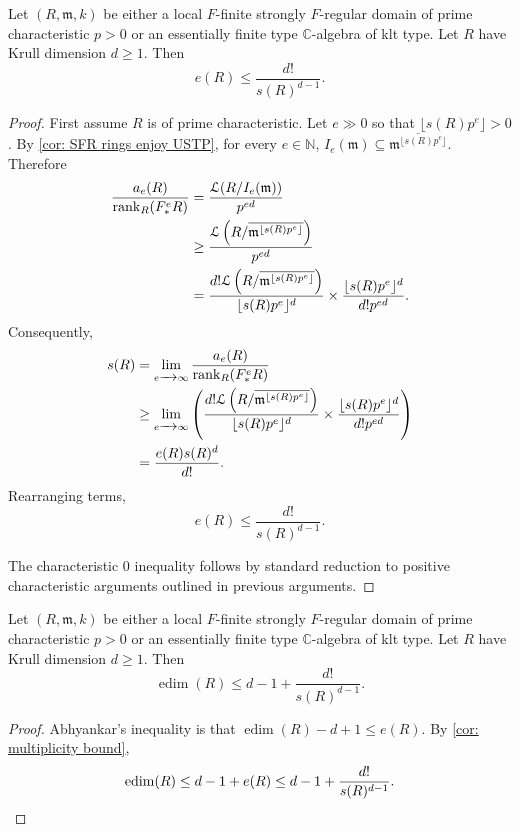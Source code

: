 \documentclass[12pt]{amsart}
\numberwithin{equation}{theorem}
\theoremstyle{plain}
\newcommand{\fm}{\mathfrak{m}}
\newcommand{\CC}{\mathbb{C}}
\newcommand{\NN}{\mathbb{N}}
\DeclareMathOperator{\edim}{edim}
\begin{document}
\begin{theorem}
    \label{cor: multiplicity bound}
    Let $(R,\fm,k)$ be either a local $F$-finite strongly $F$-regular domain of prime characteristic $p>0$ or an essentially finite type $\CC$-algebra of klt type. Let $R$ have Krull dimension $d\geq 1$. Then
    \[
    e(R)\leq \frac{d!}{s(R)^{d-1}}.
    \]
\end{theorem}

\begin{proof}
    First assume $R$ is of prime characteristic. Let $e\gg 0$ so that $\lfloor s(R)p^e\rfloor>0$. By \cref{cor: SFR rings enjoy USTP}, for every $e\in\NN$, $I_e(\fm)\subseteq \overline{\fm^{\lfloor s(R)p^e\rfloor}}.$
    Therefore
    \begin{align*}
    \frac{a_e(R)}{\rank_R(F^e_*R)} &= \frac{\mathcal{L}(R/I_e(\fm))}{p^{ed}}\\
    &\geq \frac{\mathcal{L}\left(R/\overline{\fm^{\lfloor s(R)p^e\rfloor}}\right)}{p^{ed}}\\
    &=\frac{d!\mathcal{L}\left(R/\overline{\fm^{\lfloor s(R)p^e\rfloor}}\right)}{\lfloor s(R)p^e\rfloor^d}\times \frac{\lfloor s(R)p^e\rfloor^d}{d!p^{ed}}.
    \end{align*}
    Consequently,
    \begin{align*}
        s(R) &= \lim_{e\to \infty} \frac{a_e(R)}{\rank_R(F^e_*R)}\\
        &\geq \lim_{e\to \infty} \left(\frac{d!\mathcal{L}\left(R/\overline{\fm^{\lfloor s(R)p^e\rfloor}}\right)}{\lfloor s(R)p^e\rfloor^d}\times \frac{\lfloor s(R)p^e\rfloor^d}{d!p^{ed}}\right)\\
        &= \frac{e(R)s(R)^d}{d!}.
    \end{align*}
    Rearranging terms,
    \[
    e(R)\leq \frac{d!}{s(R)^{d-1}}.
    \]

    The characteristic $0$ inequality follows by standard reduction to positive characteristic arguments outlined in previous arguments.
\end{proof}

\begin{corollary}
    \label{cor: embedding dimension bound}
    Let $(R,\fm,k)$ be either a local $F$-finite strongly $F$-regular domain of prime characteristic $p>0$ or an essentially finite type $\CC$-algebra of klt type. Let $R$ have Krull dimension $d\geq 1$. Then
    \[
    \edim(R) \leq d-1 + \frac{d!}{s(R)^{d-1}}.
    \]
\end{corollary}
\begin{proof}
    Abhyankar's inequality is that $\edim(R) - d + 1\leq e(R)$. By \cref{cor: multiplicity bound},
    \[
    \edim(R)\leq d-1 + e(R) \leq d-1 + \frac{d!}{s(R)^{d-1}}.\qedhere
    \]
\end{proof}
\end{document}
